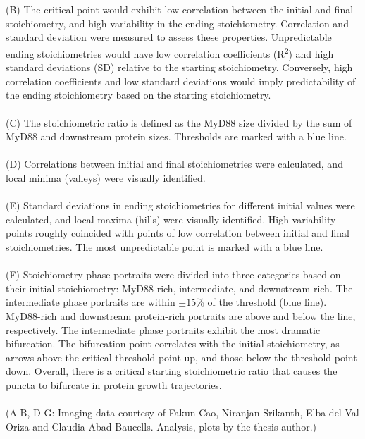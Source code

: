 \begin{centering}
{\\
\\
(B) The critical point would exhibit low correlation between the initial and final stoichiometry, and high variability in the ending stoichiometry. Correlation and standard deviation were measured to assess these properties. Unpredictable ending stoichiometries would have low correlation coefficients (R\textsuperscript{2}) and high standard deviations (SD) relative to the starting stoichiometry. Conversely, high correlation coefficients and low standard deviations would imply predictability of the ending stoichiometry based on the starting stoichiometry.
\\
\\
(C) The stoichiometric ratio is defined as the MyD88 size divided by the sum of MyD88 and downstream protein sizes. Thresholds are marked with a blue line.
\\
\\
(D) Correlations between initial and final stoichiometries were calculated, and local minima (valleys) were visually identified.
\\
\\
(E) Standard deviations in ending stoichiometries for different initial values were calculated, and local maxima (hills) were visually identified. High variability points roughly coincided with points of low correlation between initial and final stoichiometries. The most unpredictable point is marked with a blue line.
\\
\\
(F) Stoichiometry phase portraits were divided into three categories based on their initial stoichiometry: MyD88-rich, intermediate, and downstream-rich. The intermediate phase portraits are within $\pm$15\% of the threshold (blue line). MyD88-rich and downstream protein-rich portraits are above and below the line, respectively. The intermediate phase portraits exhibit the most dramatic bifurcation. The bifurcation point correlates with the initial stoichiometry, as arrows above the critical threshold point up, and those below the threshold point down. Overall, there is a critical starting stoichiometric ratio that causes the puncta to bifurcate in protein growth trajectories.
\\
\\
(A-B, D-G: Imaging data courtesy of Fakun Cao, Niranjan Srikanth, Elba del Val Oriza and Claudia Abad-Baucells. Analysis, plots by the thesis author.)}
\label{p3:S1}
\end{centering}

